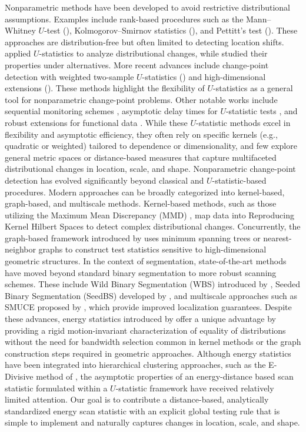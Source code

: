\documentclass[11pt]{article}
\numberwithin{theorem}{section}
\numberwithin{Lemma}{section}
\numberwithin{Definition}{section}
\begin{document}
Nonparametric methods have been developed to avoid restrictive distributional assumptions. Examples include rank-based procedures such as the Mann–Whitney $U$-test (\cite{haw1977}), Kolmogorov–Smirnov statistics (\cite{bro1993}), and Pettitt’s test (\cite{petti1979}). These approaches are distribution-free but often limited to detecting location shifts. \cite{gombay1995} applied $U$-statistics to analyze distributional changes, while \cite{gombay2001} studied their properties under alternatives. More recent advances include change-point detection with weighted two-sample $U$-statistics (\cite{DehlingVukWendler2022}) and high-dimensional extensions (\cite{Boniece2024}). These methods highlight the flexibility of  $U$-statistics as a general tool for nonparametric change-point problems. Other notable works include sequential monitoring schemes \cite{kirch2021}, asymptotic delay times for $U$-statistic tests \cite{kirch2022}, and robust extensions for functional data \cite{Wegner2024}. While these $U$-statistic methods excel in flexibility and asymptotic efficiency, they often rely on specific kernels (e.g., quadratic or weighted) tailored to dependence or dimensionality, and few explore general metric spaces or distance-based measures that capture multifaceted distributional changes in location, scale, and shape. Nonparametric change-point detection has evolved significantly beyond classical and $U$-statistic-based procedures. Modern approaches can be broadly categorized into kernel-based, graph-based, and multiscale methods. Kernel-based methods, such as those utilizing the Maximum Mean Discrepancy (MMD) \cite{li2019kernel, gretton2012kernel}, map data into Reproducing Kernel Hilbert Spaces to detect complex distributional changes. Concurrently, the graph-based framework introduced by \cite{chen2017graph} uses minimum spanning trees or nearest-neighbor graphs to construct test statistics sensitive to high-dimensional geometric structures. In the context of segmentation, state-of-the-art methods have moved beyond standard binary segmentation to more robust scanning schemes. These include Wild Binary Segmentation (WBS) introduced by \cite{fryzlewicz2014wild}, Seeded Binary Segmentation (SeedBS) developed by \cite{kovacs2020seeded}, and multiscale approaches such as SMUCE proposed by \cite{frick2014multiscale}, which provide improved localization guarantees. Despite these advances, energy statistics introduced by \cite{sze2013} offer a unique advantage by providing a rigid motion-invariant characterization of equality of distributions without the need for bandwidth selection common in kernel methods or the graph construction steps required in geometric approaches. Although energy statistics have been integrated into hierarchical clustering approaches, such as the E-Divisive method of \cite{matteson2014ecp}, the asymptotic properties of an energy-distance based scan statistic formulated within a $U$-statistic framework have received relatively limited attention. Our goal is to contribute a distance-based, analytically standardized energy scan statistic with an explicit global testing rule that is simple to implement and naturally captures changes in location, scale, and shape.
\\
\end{document}
